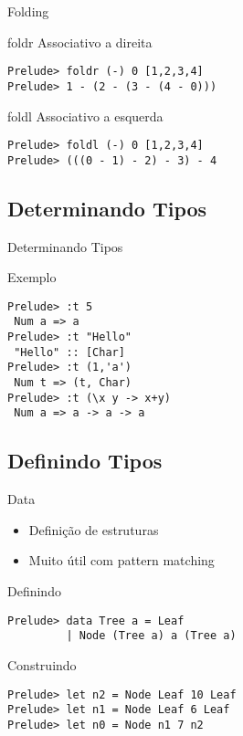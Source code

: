 \documentclass{beamer}
\begin{document}
	\begin{frame}[fragile]{Folding}
	 \begin{block}{foldr}
	  Associativo a direita
	  \begin{lstlisting}
Prelude> foldr (-) 0 [1,2,3,4]
Prelude> 1 - (2 - (3 - (4 - 0)))
	  \end{lstlisting}
	 \end{block}
	 
	 \begin{block}{foldl}
	  Associativo a esquerda
	  \begin{lstlisting}
Prelude> foldl (-) 0 [1,2,3,4]
Prelude> (((0 - 1) - 2) - 3) - 4
	  \end{lstlisting}
	 \end{block}
	\end{frame}	
	
	\subsection{Determinando Tipos}
		\begin{frame}[fragile]{Determinando Tipos}
		 \begin{block}{Exemplo}
		 \begin{lstlisting}
Prelude> :t 5
 Num a => a
Prelude> :t "Hello"
 "Hello" :: [Char]
Prelude> :t (1,'a')
 Num t => (t, Char)
Prelude> :t (\x y -> x+y)
 Num a => a -> a -> a
		 \end{lstlisting}
		 \end{block}
		\end{frame}
		
	\subsection{Definindo Tipos}
	
		\begin{frame}[fragile]{Data}
		 
		 \begin{itemize}
		  \item Definição de estruturas
		  \item Muito útil com pattern matching
		 \end{itemize}
		 
		 \begin{block}{Definindo}
		  \begin{lstlisting}
Prelude> data Tree a = Leaf 
         | Node (Tree a) a (Tree a)
		  \end{lstlisting}
		 \end{block}		 
		 \begin{block}{Construindo}
		  \begin{lstlisting}
Prelude> let n2 = Node Leaf 10 Leaf
Prelude> let n1 = Node Leaf 6 Leaf
Prelude> let n0 = Node n1 7 n2
		  \end{lstlisting}
		 \end{block}
		\end{frame}
		
\end{document}
